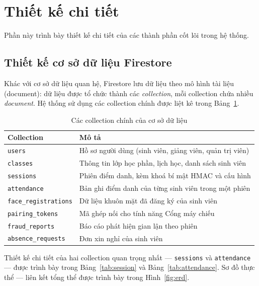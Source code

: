 \documentclass[../main.tex]{subfiles}
\begin{document}
\section{Thiết kế chi tiết}

Phần này trình bày thiết kế chi tiết của các thành phần cốt lõi trong hệ thống.

\subsection{Thiết kế cơ sở dữ liệu Firestore}
\label{sec:db-design}

Khác với cơ sở dữ liệu quan hệ, Firestore lưu dữ liệu theo mô hình tài liệu (document):
dữ liệu được tổ chức thành các \textit{collection}, mỗi collection chứa nhiều
\textit{document}. Hệ thống sử dụng các collection chính được liệt kê trong
Bảng~\ref{tab:collections}.

\begin{table}[H]
\centering
\small
\caption{Các collection chính của cơ sở dữ liệu}
\label{tab:collections}
\begin{tabular}{|l|p{9.5cm}|}
\hline
\textbf{Collection} & \textbf{Mô tả} \\
\hline
\texttt{users} & Hồ sơ người dùng (sinh viên, giảng viên, quản trị viên) \\ \hline
\texttt{classes} & Thông tin lớp học phần, lịch học, danh sách sinh viên \\ \hline
\texttt{sessions} & Phiên điểm danh, kèm khoá bí mật HMAC và cấu hình \\ \hline
\texttt{attendance} & Bản ghi điểm danh của từng sinh viên trong một phiên \\ \hline
\texttt{face\_registrations} & Dữ liệu khuôn mặt đã đăng ký của sinh viên \\ \hline
\texttt{pairing\_tokens} & Mã ghép nối cho tính năng Cổng máy chiếu \\ \hline
\texttt{fraud\_reports} & Báo cáo phát hiện gian lận theo phiên \\ \hline
\texttt{absence\_requests} & Đơn xin nghỉ của sinh viên \\ \hline
\end{tabular}
\end{table}

Thiết kế chi tiết của hai collection quan trọng nhất --- \texttt{sessions} và
\texttt{attendance} --- được trình bày trong Bảng~\ref{tab:session} và
Bảng~\ref{tab:attendance}. Sơ đồ thực thể --- liên kết tổng thể được trình bày trong
Hình~\ref{fig:erd}.
\end{document}
